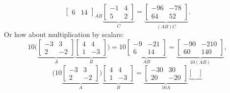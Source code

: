 \documentclass{ximera}
\begin{document}
\begin{example}
\begin{equation*}
{\begin{bmatrix}
            6 & 14
        \end{bmatrix}
        }_{AB} \underbrace{
        \begin{bmatrix}
            -1 & 4 \\ 
            5 & 2
        \end{bmatrix}
        }_C = \underbrace{
        \begin{bmatrix}
            -96 & -78 \\ 
            64 & 52
        \end{bmatrix}
        }_{(AB)C} .
    \end{equation*}
    Or how about multiplication by scalars:
    \begin{equation*}
        10 \biggl( \underbrace{
        \begin{bmatrix}
            -3 & 3 \\ 
            2 & -2
        \end{bmatrix}
        }_A \underbrace{
        \begin{bmatrix}
            4 & 4 \\ 
            1 & -3
        \end{bmatrix}
        }_B \biggr) = 10 \underbrace{
        \begin{bmatrix}
            -9 & -21 \\ 
            6 & 14
        \end{bmatrix}
        }_{A B} = \underbrace{
        \begin{bmatrix}
            -90 & -210 \\ 
            60 & 140
        \end{bmatrix}
        }_{10 (AB)} ,
    \end{equation*}
    \begin{equation*}
        \biggl( 10 \underbrace{
        \begin{bmatrix}
            -3 & 3 \\ 
            2 & -2
        \end{bmatrix}
        }_A \biggr) \underbrace{
        \begin{bmatrix}
        4 & 4 \\ 
        1 & -3
        \end{bmatrix}
        }_B = \underbrace{
        \begin{bmatrix}
            -30 & 30 \\ 
            20 & -20
        \end{bmatrix}
        }_{10 A}
        \underbrace{
        \begin{bmatrix}

\end{bmatrix}}
\end{equation*}
\end{example}
\end{document}
